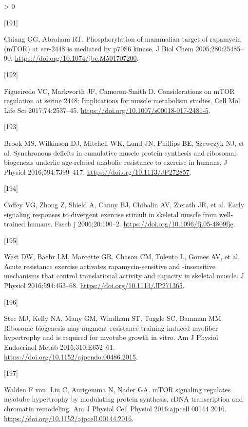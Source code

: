 \documentclass[twoside,10pt]{gihclass} %
\newlength{\cslhangindent}
\newlength{\csllabelwidth}
\newenvironment{CSLReferences}[3] %
 {%
  \setlength{\parindent}{0pt}
  \ifodd #1 \everypar{\setlength{\hangindent}{\cslhangindent}}\ignorespaces\fi
  \ifnum #2 > 0
  \setlength{\parskip}{#2\baselineskip}
  \fi
 }%
 {}
\newcommand{\CSLLeftMargin}[1]{\parbox[t]{\maxof{\widthof{#1}}{\csllabelwidth}}{#1}}
\newcommand{\CSLRightInline}[1]{\parbox[t]{\linewidth}{#1}}
\begin{document}
\begin{CSLReferences}{0}{0}
\leavevmode\hypertarget{ref-RN1902}{}%
\CSLLeftMargin{{[}191{]} }
\CSLRightInline{Chiang GG, Abraham RT. Phosphorylation of mammalian target of rapamycin (mTOR) at ser-2448 is mediated by p70S6 kinase. J Biol Chem 2005;280:25485--90. \url{https://doi.org/10.1074/jbc.M501707200}.}

\leavevmode\hypertarget{ref-RN1949}{}%
\CSLLeftMargin{{[}192{]} }
\CSLRightInline{Figueiredo VC, Markworth JF, Cameron-Smith D. Considerations on mTOR regulation at serine 2448: Implications for muscle metabolism studies. Cell Mol Life Sci 2017;74:2537--45. \url{https://doi.org/10.1007/s00018-017-2481-5}.}

\leavevmode\hypertarget{ref-RN1809}{}%
\CSLLeftMargin{{[}193{]} }
\CSLRightInline{Brook MS, Wilkinson DJ, Mitchell WK, Lund JN, Phillips BE, Szewczyk NJ, et al. Synchronous deficits in cumulative muscle protein synthesis and ribosomal biogenesis underlie age-related anabolic resistance to exercise in humans. J Physiol 2016;594:7399--417. \url{https://doi.org/10.1113/JP272857}.}

\leavevmode\hypertarget{ref-RN1871}{}%
\CSLLeftMargin{{[}194{]} }
\CSLRightInline{Coffey VG, Zhong Z, Shield A, Canny BJ, Chibalin AV, Zierath JR, et al. Early signaling responses to divergent exercise stimuli in skeletal muscle from well-trained humans. Faseb j 2006;20:190--2. \url{https://doi.org/10.1096/fj.05-4809fje}.}

\leavevmode\hypertarget{ref-RN1754}{}%
\CSLLeftMargin{{[}195{]} }
\CSLRightInline{West DW, Baehr LM, Marcotte GR, Chason CM, Tolento L, Gomes AV, et al. Acute resistance exercise activates rapamycin-sensitive and -insensitive mechanisms that control translational activity and capacity in skeletal muscle. J Physiol 2016;594:453--68. \url{https://doi.org/10.1113/JP271365}.}

\leavevmode\hypertarget{ref-RN1755}{}%
\CSLLeftMargin{{[}196{]} }
\CSLRightInline{Stec MJ, Kelly NA, Many GM, Windham ST, Tuggle SC, Bamman MM. Ribosome biogenesis may augment resistance training-induced myofiber hypertrophy and is required for myotube growth in vitro. Am J Physiol Endocrinol Metab 2016;310:E652--61. \url{https://doi.org/10.1152/ajpendo.00486.2015}.}

\leavevmode\hypertarget{ref-RN1810}{}%
\CSLLeftMargin{{[}197{]} }
\CSLRightInline{Walden F von, Liu C, Aurigemma N, Nader GA. mTOR signaling regulates myotube hypertrophy by modulating protein synthesis, rDNA transcription and chromatin remodeling. Am J Physiol Cell Physiol 2016:ajpcell 00144 2016. \url{https://doi.org/10.1152/ajpcell.00144.2016}.}


\end{CSLReferences}
\end{document}
